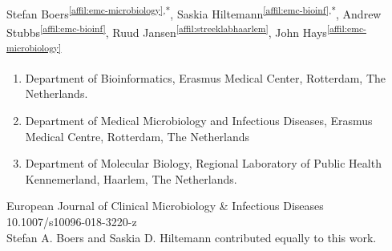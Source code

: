 \setcounter{NAT@ctr}{-1}

Stefan Boers\textsuperscript{\ref{affil:emc-microbiology},*},
Saskia Hiltemann\textsuperscript{\ref{affil:emc-bioinf},*},
Andrew Stubbs\textsuperscript{\ref{affil:emc-bioinf}},
Ruud Jansen\textsuperscript{\ref{affil:streeklabhaarlem}},
John Hays\textsuperscript{\ref{affil:emc-microbiology}}

\small
\begin{enumerate}
\itemsep-0.5em
\item Department of Bioinformatics, Erasmus Medical Center, Rotterdam, The Netherlands. \label{affil:emc-bioinf}
\item Department of Medical Microbiology and Infectious Diseases, Erasmus Medical Centre, Rotterdam, The Netherlands \label{affil:emc-microbiology}
\item Department of Molecular Biology, Regional Laboratory of Public Health Kennemerland, Haarlem, The Netherlands. \label{affil:streeklabhaarlem}
\end{enumerate}

{\color{chaptergrey}{Published in:}} European Journal of Clinical Microbiology \& Infectious Diseases \\
{\color{chaptergrey}{DOI:}} 10.1007/s10096-018-3220-z \\
{\color{chaptergrey}{*:}} Stefan A. Boers and Saskia D. Hiltemann contributed equally to this work.

\normalsize


